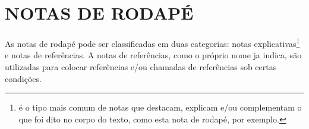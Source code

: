 \chapter{NOTAS DE RODAPÉ}
\label{chap:notasRodape}

As notas de rodapé pode ser classificadas em duas categorias: notas explicativas\footnote{é o tipo mais comum de notas que destacam, explicam e/ou complementam o que foi dito no corpo do texto, como esta nota de rodapé, por exemplo.} e notas de referências. A notas de referências, como o próprio nome ja indica, são utilizadas para colocar referências e/ou chamadas de referências sob certas condições.
